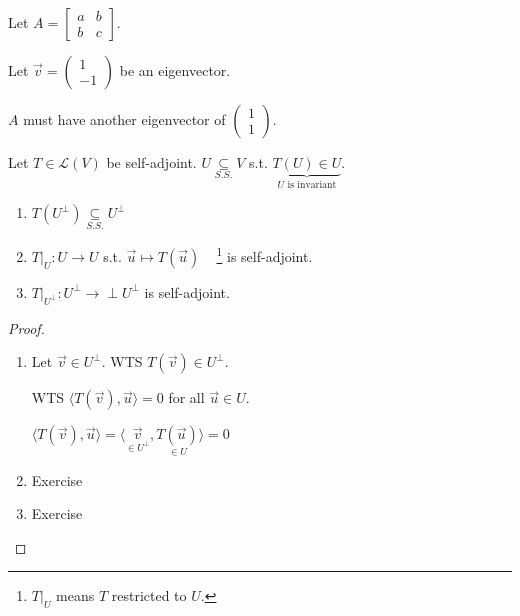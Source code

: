 \documentclass[11pt,fleqn]{book} %
\begin{document}
\begin{example}
{~~~}

    Let $A = \begin{bmatrix} a &b \\ b &c \end{bmatrix}$.

    Let $\vec{v} = \begin{pmatrix} 1 \\ -1 \end{pmatrix}$ be an eigenvector.

    $A$ must have another eigenvector of $\begin{pmatrix} 1 \\ 1 \end{pmatrix}$.
\end{example}

\setcounter{section}{0}
\setcounter{dummy}{9}
\begin{proposition}
    Let $T \in \mathcal{L}(V)$ be self-adjoint. $U \underset{S.S.}{\subseteq} V$ s.t. $\underbrace{T(U) \in U}_{U\text{ is invariant}}$.

    \begin{enumerate}
        \item $T(U^\perp) \underset{S.S.}{\subseteq} U^\perp$
        \item $T \bigg|_U: U \to U$ s.t. $\vec{u} \mapsto T(\vec{u})$ ~ \footnote{$T \bigg|_U$ means $T$ restricted to $U$. } is self-adjoint.
        \item $T\bigg|_{U^\perp}: U^\perp \to \perp U^\perp$ is self-adjoint.
    \end{enumerate}
\end{proposition}

\begin{proof}
    \begin{enumerate}
        \item Let $\vec{v} \in U^\perp$. WTS $T(\vec{v}) \in U^\perp$.

        WTS $\langle T(\vec{v}), \vec{u} \rangle = 0$ for all $\vec{u} \in U$.

        $\langle T(\vec{v}), \vec{u} \rangle = \langle \underset{\in U^\perp}{\vec{v}}, \underset{\in U}{T(\vec{u})} \rangle = 0$

        \item Exercise

        \item Exercise
    \end{enumerate}
\end{proof}
\end{document}
